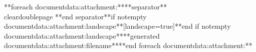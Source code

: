 \documentclass[twoside]{scrartcl}
\begin{document}

	
	\cleardoublepage

	**foreach documentdata:attachment:****separator**\\cleardoublepage **end separator**\*if notempty documentdata:attachment:landscape**[landscape=true]**end if notempty documentdata:attachment:landscape**{**generated documentdata:attachment:filename**}**end foreach documentdata:attachment:**
\end{document}

